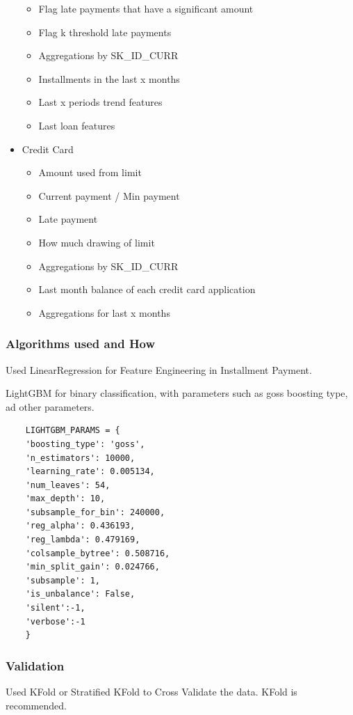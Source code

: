 \documentclass[twoside,a4paper]{article}
\begin{document}
\begin{itemize}
\begin{itemize}
        \item Flag late payments that have a significant amount
        \item Flag k threshold late payments
        \item Aggregations by SK\_ID\_CURR
        \item Installments in the last x months
        \item Last x periods trend features
        \item Last loan features
    \end{itemize}
    \item Credit Card
    \begin{itemize}
        \item Amount used from limit
        \item Current payment / Min payment
        \item Late payment
        \item How much drawing of limit
        \item Aggregations by SK\_ID\_CURR
        \item Last month balance of each credit card application
        \item Aggregations for last x months
    \end{itemize}
\end{itemize}

\subsubsection{Algorithms used and How}
Used LinearRegression for Feature Engineering in Installment Payment.

LightGBM for binary classification, with parameters such as goss boosting type, ad other parameters.

\begin{lstlisting}
    LIGHTGBM_PARAMS = {
    'boosting_type': 'goss',
    'n_estimators': 10000,
    'learning_rate': 0.005134,
    'num_leaves': 54,
    'max_depth': 10,
    'subsample_for_bin': 240000,
    'reg_alpha': 0.436193,
    'reg_lambda': 0.479169,
    'colsample_bytree': 0.508716,
    'min_split_gain': 0.024766,
    'subsample': 1,
    'is_unbalance': False,
    'silent':-1,
    'verbose':-1
    }
\end{lstlisting}

\subsubsection{Validation}
Used KFold or Stratified KFold to Cross Validate the data. KFold is recommended.
\end{document}
